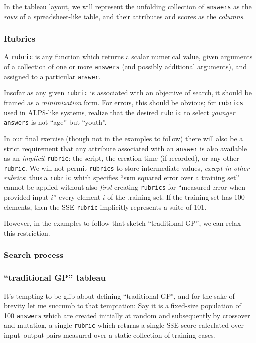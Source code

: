 In the tableau layout, we will represent the unfolding collection of {\tt answers} as the \emph{rows} of a spreadsheet-like table, and their attributes and scores as the \emph{columns}.

\subsubsection{Rubrics}\hypertarget{rubrics}{}\label{rubrics}

A {\tt rubric} is any function which returns a scalar numerical value, given arguments of a collection of one or more {\tt answers} (and possibly additional arguments), and assigned to a particular {\tt answer}.

Insofar as any given {\tt rubric} is associated with an objective of search, it should be framed as a \emph{minimization} form. For errors, this should be obvious; for {\tt rubrics} used in ALPS-like systems, realize that the desired {\tt rubric} to select \emph{younger} {\tt answers} is not ``age'' but ``youth''.

In our final exercise (though not in the examples to follow) there will also be a strict requirement that any attribute associated with an {\tt answer} is also available as an \emph{implicit} {\tt rubric}: the script, the creation time (if recorded), or any other {\tt rubric}. We will not permit {\tt rubrics} to store intermediate values, \emph{except in other rubrics}: thus a {\tt rubric} which specifies ``sum squared error over a training set'' cannot be applied without also \emph{first} creating {\tt rubrics} for ``measured error when provided input $i$'' every element $i$ of the training set. If the training set has 100 elements, then the SSE {\tt rubric} implicitly represents a suite of 101.

However, in the examples to follow that sketch ``traditional GP'', we can relax this restriction.

\subsubsection{Search process}\hypertarget{search-process}{}\label{search-process}

\subsubsection{``traditional GP'' tableau}\hypertarget{traditional-gp-tableau}{}\label{traditional-gp-tableau}

It's tempting to be glib about defining ``traditional GP'', and for the sake of brevity let me succumb to that temptation: Say it is a fixed-size population of 100 {\tt answers} which are created initially at random and subsequently by crossover and mutation, a single {\tt rubric} which returns a single SSE score calculated over input--output pairs measured over a static collection of training cases.

